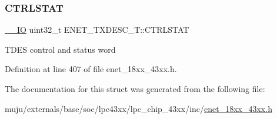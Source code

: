 \subsubsection{\texorpdfstring{C\+T\+R\+L\+S\+T\+AT}{CTRLSTAT}}
{\footnotesize\ttfamily \hyperlink{core__sc300_8h_aec43007d9998a0a0e01faede4133d6be}{\+\_\+\+\_\+\+IO} uint32\+\_\+t E\+N\+E\+T\+\_\+\+T\+X\+D\+E\+S\+C\+\_\+\+T\+::\+C\+T\+R\+L\+S\+T\+AT}

T\+D\+ES control and status word 

Definition at line 407 of file enet\+\_\+18xx\+\_\+43xx.\+h.



The documentation for this struct was generated from the following file\+:\begin{DoxyCompactItemize}
\item 
muju/externals/base/soc/lpc43xx/lpc\+\_\+chip\+\_\+43xx/inc/\hyperlink{enet__18xx__43xx_8h}{enet\+\_\+18xx\+\_\+43xx.\+h}\end{DoxyCompactItemize}

